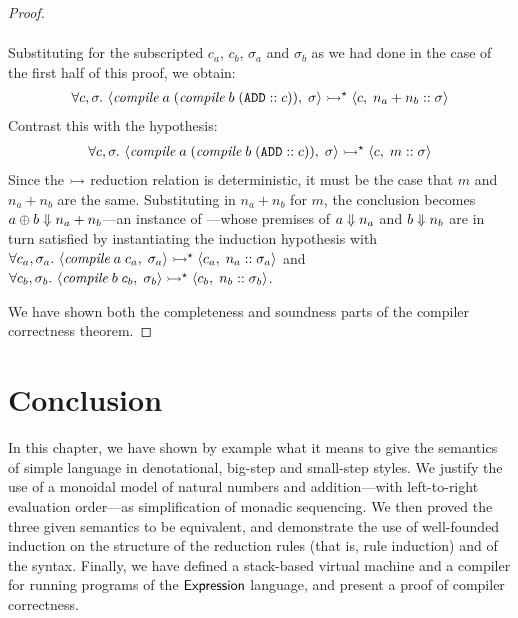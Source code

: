 \begin{proof}
\begin{description}
\begin{gather*}
\end{gather*}
Substituting for the subscripted $c_a$, $c_b$, $\sigma_a$ and $\sigma_b$ as
we had done in the  case of the first half of this proof,
we obtain:
\begin{gather*}
	\forall c, \sigma.\
		\MS<\compile\;a\;(\compile\;b\;(\ADD :: c)), \sigma>
			\ExecS \MS<c, n_a + n_b :: \sigma>
\end{gather*}
Contrast this with the hypothesis:
\begin{gather*}
	\forall c, \sigma.\
		\MS<\compile\;a\;(\compile\;b\;(\ADD :: c)), \sigma>
			\ExecS \MS<c, m :: \sigma>
\end{gather*}
Since the $\rightarrowtail$ reduction relation is deterministic, it must be the case
that $m$ and $n_a + n_b$ are the same. Substituting in $n_a + n_b$ for $m$,
the conclusion becomes $a \oplus b \Downarrow n_a + n_b$---an instance of
\eqName{big-plus}---whose premises of $a \Downarrow n_a$ and $b \Downarrow n_b$ are in
turn satisfied by instantiating the induction hypothesis with $\forall c_a,
\sigma_a.\ \MS<\compile\;a\;c_a, \sigma_a> \ExecS \MS<c_a, n_a :: \sigma_a>$
and $\forall c_b, \sigma_b.\ \MS<\compile\;b\;c_b, \sigma_b> \ExecS \MS<c_b,
n_b :: \sigma_b>$.


\end{description}
We have shown both the completeness and soundness parts of the compiler
correctness theorem.
\end{proof}



\section{Conclusion}%

In this chapter, we have shown by example what it means to give the
semantics of simple language in denotational, big-step and small-step
styles. We justify the use of a monoidal model of natural numbers and
addition---with left-to-right evaluation order---as simplification of
monadic sequencing. We then proved the three given semantics to be
equivalent, and demonstrate the use of well-founded induction on the
structure of the reduction rules (that is, rule induction) and of the
syntax. Finally, we have defined a stack-based virtual machine and
a compiler for running programs of the $\textsf{Expression}$ language, and present
a proof of compiler correctness.




